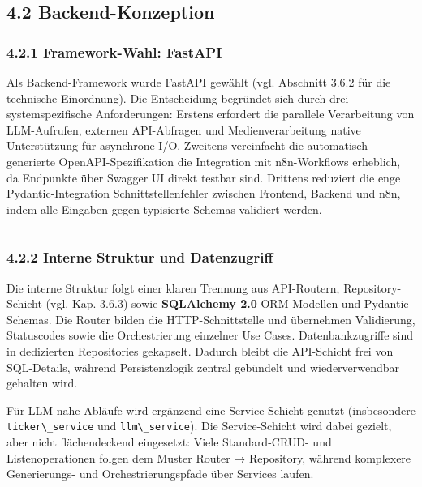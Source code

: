 \subsection{4.2 Backend-Konzeption}\label{backend-konzeption}

\subsubsection{4.2.1 Framework-Wahl:
FastAPI}\label{framework-wahl-fastapi}

Als Backend-Framework wurde FastAPI gewählt (vgl. Abschnitt 3.6.2 für
die technische Einordnung). Die Entscheidung begründet sich durch drei
systemspezifische Anforderungen: Erstens erfordert die parallele
Verarbeitung von LLM-Aufrufen, externen API-Abfragen und
Medienverarbeitung native Unterstützung für asynchrone I/O. Zweitens
vereinfacht die automatisch generierte OpenAPI-Spezifikation die
Integration mit n8n-Workflows erheblich, da Endpunkte über Swagger UI
direkt testbar sind. Drittens reduziert die enge Pydantic-Integration
Schnittstellenfehler zwischen Frontend, Backend und n8n, indem alle
Eingaben gegen typisierte Schemas validiert werden.

\begin{center}\rule{0.5\linewidth}{0.5pt}\end{center}

\subsubsection{4.2.2 Interne Struktur und
Datenzugriff}\label{interne-struktur-und-datenzugriff}

Die interne Struktur folgt einer klaren Trennung aus API-Routern,
Repository-Schicht (vgl. Kap. 3.6.3) sowie \textbf{SQLAlchemy
2.0}-ORM-Modellen und Pydantic-Schemas. Die Router bilden die
HTTP-Schnittstelle und übernehmen Validierung, Statuscodes sowie die
Orchestrierung einzelner Use Cases. Datenbankzugriffe sind in
dedizierten Repositories gekapselt. Dadurch bleibt die API-Schicht frei
von SQL-Details, während Persistenzlogik zentral gebündelt und
wiederverwendbar gehalten wird.

Für LLM-nahe Abläufe wird ergänzend eine Service-Schicht genutzt
(insbesondere \passthrough{\lstinline!ticker\_service!} und
\passthrough{\lstinline!llm\_service!}). Die Service-Schicht wird dabei
gezielt, aber nicht flächendeckend eingesetzt: Viele Standard-CRUD- und
Listenoperationen folgen dem Muster Router → Repository, während
komplexere Generierungs- und Orchestrierungspfade über Services laufen.

